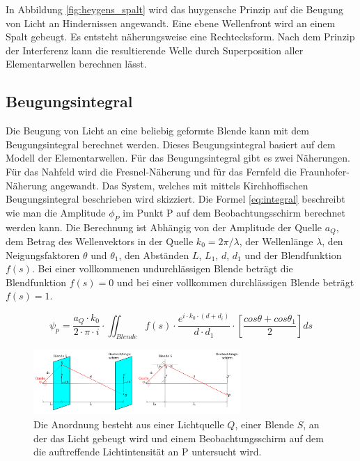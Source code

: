 In Abbildung \ref{fig:heygens_spalt} wird das huygensche Prinzip auf die Beugung von Licht an Hindernissen angewandt. Eine ebene Wellenfront wird an einem Spalt gebeugt. Es entsteht näherungsweise eine Rechtecksform. Nach dem Prinzip der Interferenz kann die resultierende Welle durch Superposition aller Elementarwellen berechnen lässt. 





\subsection{Beugungsintegral}
Die Beugung von Licht an eine beliebig geformte Blende kann mit dem Beugungsintegral berechnet werden. Dieses Beugungsintegral basiert auf dem Modell der Elementarwellen. Für das Beugungsintegral gibt es zwei Näherungen. Für das Nahfeld wird die Fresnel-Näherung und für das Fernfeld die Fraunhofer-Näherung angewandt. Das System, welches mit mittels Kirchhoffischen Beugungsintegral beschrieben wird skizziert. Die Formel \ref{eq:integral} beschreibt wie man die Amplitude $ \phi_{P} $ im Punkt P auf dem Beobachtungsschirm berechnet werden kann. Die Berechnung ist Abhängig von der Amplitude der Quelle $ a_{Q} $, dem Betrag des Wellenvektors in der Quelle $ k_{0} = 2 \pi/\lambda $, der Wellenlänge $ \lambda $, den Neigungsfaktoren $ \theta $ und $ \theta_{1} $, den Abständen $ L $, $ L_{1} $, $ d $, $ d_{1} $ und der Blendfunktion $ f(s) $. Bei einer vollkommenen undurchlässigen Blende beträgt die Blendfunktion $ f(s)=0 $ und bei einer vollkommen durchlässigen Blende beträgt $ f(s)=1 $.

\begin{equation}\label{eq:integral}
\psi_{p}=\frac{a_{Q}\cdot k_{0}}{2\cdot \pi \cdot i} \cdot \iint_{Blende} f(s) \cdot\frac{e^{i\cdot k_{0}\cdot (d +d_{i})}}{d\cdot d_{1}} \cdot \left[ \frac{cos\theta + cos\theta_{1}}{2} \right] ds
\end{equation}

\begin{figure}[h!]
	\centering
	\includegraphics[width=0.7\textwidth]{data/skizze_beugungsintegral.png}
	\caption{Die Anordnung besteht aus einer Lichtquelle $ Q $, einer Blende $ S $, an der das Licht gebeugt wird und einem Beobachtungsschirm auf dem die auftreffende Lichtintensität an P untersucht wird.}
	\label{fig:integral}
\end{figure}


